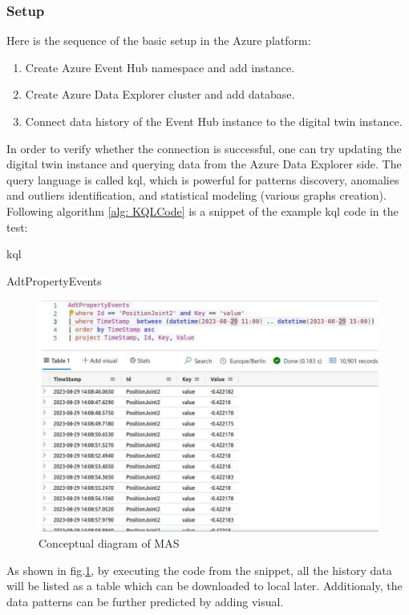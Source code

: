 \subsubsection{Setup}
Here is the sequence of the basic setup in the Azure platform:
\begin{enumerate}
    \item Create Azure Event Hub namespace and add instance.
    \item Create Azure Data Explorer cluster and add database.
    \item Connect data history of the Event Hub instance to the digital twin instance.
\end{enumerate}

In order to verify whether the connection is successful, one can try updating the 
digital twin instance and querying data from the Azure Data Explorer side. The query
language is called \gls{kql}, which is powerful for patterns discovery, anomalies 
and outliers identification, and statistical modeling (various graphs creation). 
Following algorithm \ref{alg: KQLCode} is a snippet of the example \gls{kql} code in the test: 

\begin{algorithm}
    \caption{\gls{kql}}
    \label{alg: KQLCode}
    \begin{algorithmic}
        \State  AdtPropertyEvents 
    \end{algorithmic}
\end{algorithm}


\begin{figure}[htb]
    \includegraphics[width=\textwidth]{figures/KQL_cut.jpg}
    
    \centering
    \caption{Conceptual diagram of MAS\label{fig: KQL}}
\end{figure}

As shown in fig.\ref{fig: KQL}, by executing the code from the snippet, all the history data will be listed as a table 
which can be downloaded to local later. 
Additionaly, the data patterns can be further predicted by adding visual. 